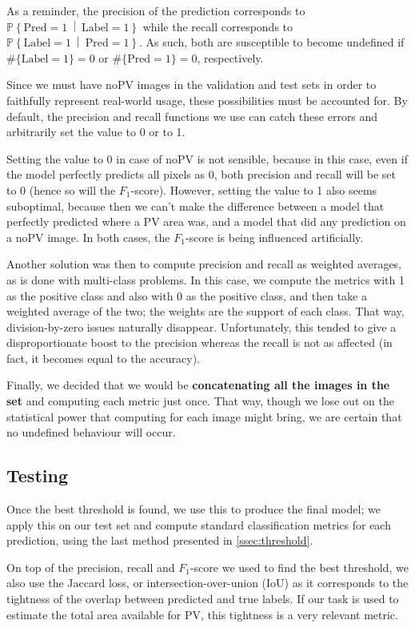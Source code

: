 \documentclass[10pt,conference]{IEEEtran}
\renewcommand\P[1]{\mathbb{P}\!\left\{#1\right\}}
\newcommand\given{\:\middle|\:}
\newcommand\tl[1]{\{\text{Label} = #1\}}
\newcommand\pl[1]{\{\text{Pred} = #1\}}
\begin{document}
As a reminder, the precision of the prediction
corresponds to $\P{\text{Pred}=1 \given \text{Label} = 1}$ while
the recall corresponds to $\P{\text{Label}=1 \given \text{Pred} = 1}$.
As such, both are susceptible to become undefined if
$\#\tl1 = 0$ or $\#\pl1 = 0$, respectively.

Since we must have noPV images in the validation and test sets in order to faithfully represent real-world usage,
these possibilities must be accounted for.
By default, the precision and recall functions we use
can catch these errors and arbitrarily set the value to
0 or to 1.

Setting the value to 0 in case of noPV is not sensible,
because in this case, even if the model perfectly predicts
all pixels as 0, both precision and recall will be set to 0
(hence so will the $F_1$-score).
However, setting the value to 1 also seems suboptimal, because
then we can't make the difference between a model that
perfectly predicted where a PV area was, and a model
that did any prediction on a noPV image.
In both cases, the $F_1$-score is being influenced artificially.

Another solution was then to compute precision and recall
as weighted averages, as is done with multi-class
problems.
In this case, we compute the metrics 
with 1 as the positive class and also with 0 as the
positive class, and then take a weighted average of
the two; the weights are the support of each class.
That way, division-by-zero issues naturally disappear.
Unfortunately, this tended to give a disproportionate
boost to the precision whereas the recall is not as
affected (in fact, it becomes equal to the accuracy).

Finally, we decided that we would be \textbf{concatenating all the images
in the set} and computing each metric just once.
That way, though we lose out on the statistical power
that computing for each image might bring, we are
certain that no undefined behaviour will occur.

\subsection{Testing}
Once the best threshold is found, we use this to produce
the final model; we apply this on our test set and compute
standard classification metrics for each prediction,
using the last method presented in \autoref{ssec:threshold}.

On top of the precision, recall and $F_1$-score we used
to find the best threshold, we also use the
Jaccard loss, or intersection-over-union (IoU) as
it corresponds to the tightness of the overlap between
predicted and true labels.
If our task is used to estimate the total area available
for PV, this tightness is a very relevant metric.
\end{document}
